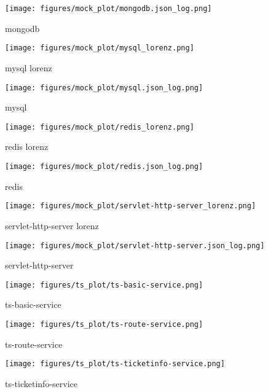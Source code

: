 \begin{appendices}
\begin{figure}[htp]
    \centering
    \texttt{[image: figures/mock\_plot/mongodb.json\_log.png]}
    \caption{mongodb}
\end{figure}

\begin{figure}[htp]
    \centering
    \texttt{[image: figures/mock\_plot/mysql\_lorenz.png]}
    \caption{mysql lorenz}
\end{figure}

\begin{figure}[htp]
    \centering
    \texttt{[image: figures/mock\_plot/mysql.json\_log.png]}
    \caption{mysql}
\end{figure}

\begin{figure}[htp]
    \centering
    \texttt{[image: figures/mock\_plot/redis\_lorenz.png]}
    \caption{redis lorenz}
\end{figure}

\begin{figure}[htp]
    \centering
    \texttt{[image: figures/mock\_plot/redis.json\_log.png]}
    \caption{redis}
\end{figure}

\begin{figure}[htp]
    \centering
    \texttt{[image: figures/mock\_plot/servlet-http-server\_lorenz.png]}
    \caption{servlet-http-server lorenz}
\end{figure}

\begin{figure}[htp]
    \centering
    \texttt{[image: figures/mock\_plot/servlet-http-server.json\_log.png]}
    \caption{servlet-http-server}
\end{figure}

  \begin{figure}[htp]
    \centering
    \texttt{[image: figures/ts\_plot/ts-basic-service.png]}
    \caption{ts-basic-service}
  \end{figure}
    

  \begin{figure}[htp]
    \centering
    \texttt{[image: figures/ts\_plot/ts-route-service.png]}
    \caption{ts-route-service}
  \end{figure}
    

  \begin{figure}[htp]
    \centering
    \texttt{[image: figures/ts\_plot/ts-ticketinfo-service.png]}
    \caption{ts-ticketinfo-service}
  \end{figure}
    


\end{appendices}
